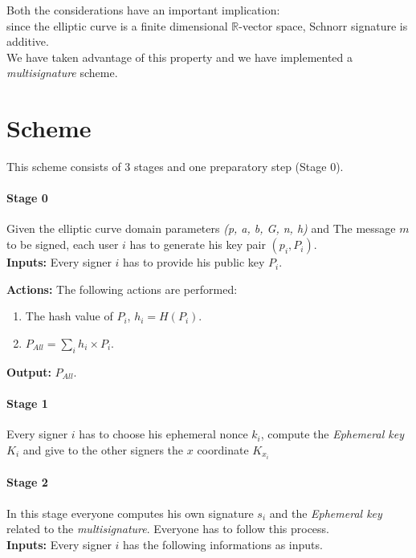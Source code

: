 Both the considerations have an important implication:\\
since the elliptic curve is a finite dimensional $\mathbb{R}$-vector space, Schnorr signature is additive.\\
We have taken advantage of this property and we have implemented a \textit{multisignature} scheme.

\section{Scheme}
This scheme consists of 3 stages and one preparatory step (Stage 0).
\paragraph{Stage 0} 
Given the elliptic curve domain parameters \textit{(p, a, b, G, n, h)} and The message $m$ to be signed, each user $i$ has to generate his key pair $(p_{i},P_{i})$.\\

\textbf{Inputs:} Every signer $i$ has to provide his public key $P_{i}$.

\textbf{Actions:} The following actions are performed:

\hspace{1.2cm}
\begin{minipage}[l]{2\linewidth}
	\begin{enumerate}
		\item The hash value of $P_{i}$, $h_{i}=H(P_{i})$.
		\item $P_{All}=\sum_{i} h_{i}\times P_{i}.$
	\end{enumerate}
\end{minipage}

\textbf{Output:} $P_{All}$.

\paragraph{Stage 1}

Every signer $i$ has to choose his ephemeral nonce $k_{i}$, compute the \textit{Ephemeral key} $K_{i}$ and give to the other signers the $x$ coordinate $K_{x_{i}}$

\paragraph{Stage 2}
In this stage everyone computes his own signature $s_{i}$ and the \textit{Ephemeral key} related to the \textit{multisignature}. Everyone has to follow this process.\\
\textbf{Inputs:} Every signer $i$ has the following informations as inputs.

